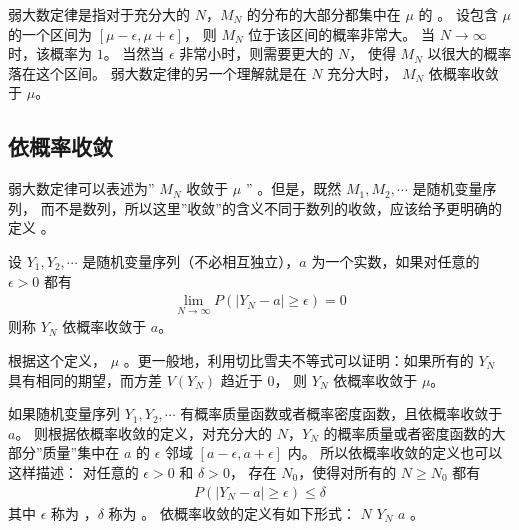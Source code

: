 \documentclass[letterpaper,10pt,english]{sphinxmanual}
\begin{document}
弱大数定律是指对于充分大的 \(N\)，\(M_N\) 的分布的大部分都集中在 \(\mu\) 的  。
设包含 \(\mu\) 的一个区间为 \([\mu-\epsilon,\mu+\epsilon]\)，
则 \(M_N\) 位于该区间的概率非常大。
当 \(N \rightarrow \infty\) 时，该概率为 \(1\)。
当然当 \(\epsilon\) 非常小时，则需要更大的 \(N\)，
使得 \(M_N\) 以很大的概率落在这个区间。
弱大数定律的另一个理解就是在 \(N\) 充分大时， \(M_N\) 依概率收敛于 \(\mu\)。


\subsection{依概率收敛}
\label{\detokenize{_u63a8_u65ad_u4e0e_u68c0_u9a8c/content:id9}}
弱大数定律可以表述为” \(M_N\) 收敛于 \(\mu\) ”
。但是，既然 \(M_1,M_2,\cdots\) 是随机变量序列，
而不是数列，所以这里”收敛”的含义不同于数列的收敛，应该给予更明确的定义
。

\begin{sphinxShadowBox}

设 \(Y_1,Y_2,\cdots\) 是随机变量序列（不必相互独立），\(a\) 为一个实数，如果对任意的 \(\epsilon >0\) 都有
\begin{equation}\label{equation:推断与检验/content:推断与检验/content:33}
\begin{split}\lim_{N \rightarrow \infty} P(| Y_N - a| \geq \epsilon ) = 0\end{split}
\end{equation}
则称 \(Y_N\) 依概率收敛于 \(a\)。
\end{sphinxShadowBox}

根据这个定义， \(\mu\)
。更一般地，利用切比雪夫不等式可以证明：如果所有的 \(Y_N\) 具有相同的期望，而方差 \(V(Y_N)\) 趋近于 \(0\)，
则 \(Y_N\) 依概率收敛于 \(\mu\)。

如果随机变量序列 \(Y_1,Y_2,\cdots\) 有概率质量函数或者概率密度函数，且依概率收敛于 \(a\)。
则根据依概率收敛的定义，对充分大的 \(N\)，\(Y_N\) 的概率质量或者密度函数的大部分”质量”集中在 \(a\)
的 \(\epsilon\) 邻域 \([a-\epsilon,a+\epsilon]\) 内。
所以依概率收敛的定义也可以这样描述：
对任意的 \(\epsilon >0\) 和 \(\delta >0\)，
存在 \(N_0\)，使得对所有的 \(N \geq N_0\) 都有
\begin{equation}\label{equation:推断与检验/content:推断与检验/content:34}
\begin{split}P(|Y_N - a| \geq \epsilon) \leq \delta\end{split}
\end{equation}
其中 \(\epsilon\) 称为 ，\(\delta\) 称为 。
依概率收敛的定义有如下形式：
 \(N\)  \(Y_N\)  \(a\) 。
\end{document}
